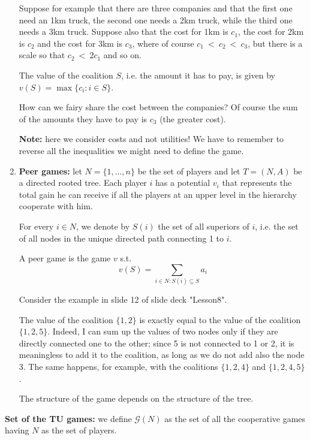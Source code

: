\begin{enumerate}
	\noindent Suppose for example that there are three companies and that the 
	first one need an 1km truck, the second one needs a 2km truck, while the 
	third one needs a 3km truck. Suppose also that the cost for 1km is $c_1$, 
	the cost for 2km is $c_2$ and the cost for 3km is $c_3$, where of course 
	$c_1~<~c_2~<~c_3$, but there is a scale so that $c_2~<~2c_1$ and so on.
	
	\noindent The value of the coalition $S$, i.e. the amount it has to pay, is given by $v(S) = \max\{c_i: i \in S\}$.
	
	\noindent How can we fairy share the cost between the companies? Of course 
	the sum of the amounts they have to pay is $c_3$ (the greater cost).
	
	\noindent \textbf{Note:} here we consider costs and not utilities! We have to 
	remember to reverse all the inequalities we might need to define the game.
	
	\item \textbf{Peer games:}	let $N = \{1,...,n\}$ be the set of players and let $T = (N,A)$ be a directed rooted tree. Each player $i$ has a potential $v_i$ that represents the total gain he can receive if all the players at an upper level in the hierarchy cooperate with him.
	
	\noindent For every $i \in N$, we denote by $S(i)$ the set of all superiors of $i$, i.e. the set of all nodes in the unique directed path connecting 1 to $i$. 
	
	\noindent A peer game is the game $v$ s.t. 
	\[
		v(S) = \sum_{i \in N: S(i) \subseteq S}{a_i}
	\]

	\noindent Consider the example in slide 12 of slide deck "Lesson8".
	
	\noindent The value of the coalition $\{1,2\}$ is exactly equal to the value 
	of the coalition $\{1,2,5\}$. Indeed, I can sum up the values of two nodes 
	only if they are directly connected one to the other; since 5 is not 
	connected to 1 or 2, it is meaningless to add it to the coalition, as long 
	as we do not add also the node 3. The same happens, for example, with the 
	coalitions $\{1,2,4\}$ and $\{1,2,4,5\}$.
	
	\noindent The structure of the game depends on the structure of the tree.
	
\end{enumerate}	

\bigskip
\noindent \textbf{Set of the TU games:} we define $\mathcal{G}(N)$ as the set of all the cooperative games having $N$ as the set of players.

